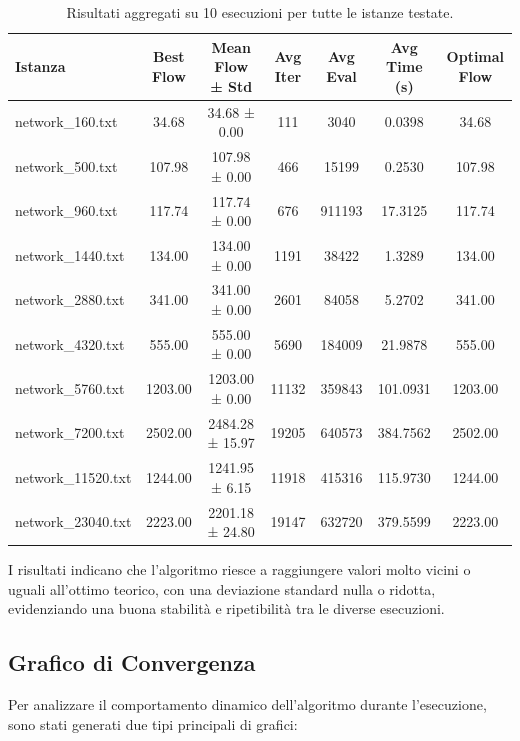 \documentclass[12pt,a4paper]{article}
\begin{document}
\begin{table}[ht]
\centering
\begin{adjustbox}{max width=\textwidth}
\begin{tabular}{|l|c|c|c|c|c|c|}
\hline
\textbf{Istanza} & \textbf{Best Flow} & \textbf{Mean Flow ± Std} & \textbf{Avg Iter} & \textbf{Avg Eval} & \textbf{Avg Time (s)} & \textbf{Optimal Flow} \\
\hline
network\_160.txt & 34.68 & 34.68 ± 0.00 & 111 & 3040 & 0.0398 & 34.68 \\
network\_500.txt & 107.98 & 107.98 ± 0.00 & 466 & 15199 & 0.2530 & 107.98 \\
network\_960.txt & 117.74 & 117.74 ± 0.00 & 676 & 911193 & 17.3125 & 117.74 \\
network\_1440.txt & 134.00 & 134.00 ± 0.00 & 1191 & 38422 & 1.3289 & 134.00 \\
network\_2880.txt & 341.00 & 341.00 ± 0.00 & 2601 & 84058 & 5.2702 & 341.00 \\
network\_4320.txt & 555.00 & 555.00 ± 0.00 & 5690 & 184009 & 21.9878 & 555.00 \\
network\_5760.txt & 1203.00 & 1203.00 ± 0.00 & 11132 & 359843 & 101.0931 & 1203.00 \\
network\_7200.txt & 2502.00 & 2484.28 ± 15.97 & 19205 & 640573 & 384.7562 & 2502.00 \\
network\_11520.txt & 1244.00 & 1241.95 ± 6.15 & 11918 & 415316 & 115.9730 & 1244.00 \\
network\_23040.txt & 2223.00 & 2201.18 ± 24.80 & 19147 & 632720 & 379.5599 & 2223.00 \\
\hline
\end{tabular}
\end{adjustbox}
\caption{Risultati aggregati su 10 esecuzioni per tutte le istanze testate.}
\label{tab:risultati_aggregati}
\end{table}

I risultati indicano che l’algoritmo riesce a raggiungere valori molto vicini o uguali all’ottimo teorico, con una deviazione standard nulla o ridotta, evidenziando una buona stabilità e ripetibilità tra le diverse esecuzioni.

\subsection{Grafico di Convergenza}

Per analizzare il comportamento dinamico dell’algoritmo durante l’esecuzione, sono stati generati due tipi principali di grafici:
\end{document}

